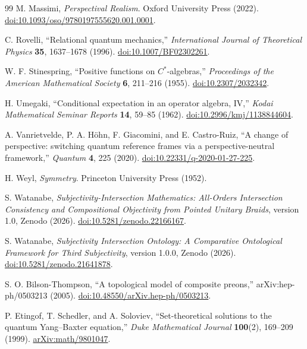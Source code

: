 \documentclass[11pt]{article}
\theoremstyle{definition}
\theoremstyle{remark}
\begin{document}
\begin{thebibliography}{99}
M. Massimi, \emph{Perspectival Realism}. Oxford University Press (2022). \href{https://doi.org/10.1093/oso/9780197555620.001.0001}{doi:10.1093/oso/9780197555620.001.0001}.

C. Rovelli, ``Relational quantum mechanics,'' \emph{International Journal of Theoretical Physics} \textbf{35}, 1637--1678 (1996). \href{https://doi.org/10.1007/BF02302261}{doi:10.1007/BF02302261}.

W. F. Stinespring, ``Positive functions on $C^*$-algebras,'' \emph{Proceedings of the American Mathematical Society} \textbf{6}, 211--216 (1955). \href{https://doi.org/10.2307/2032342}{doi:10.2307/2032342}.

H. Umegaki, ``Conditional expectation in an operator algebra, IV,'' \emph{Kodai Mathematical Seminar Reports} \textbf{14}, 59--85 (1962). \href{https://doi.org/10.2996/kmj/1138844604}{doi:10.2996/kmj/1138844604}.

A. Vanrietvelde, P. A. H\"ohn, F. Giacomini, and E. Castro-Ruiz, ``A change of perspective: switching quantum reference frames via a perspective-neutral framework,'' \emph{Quantum} \textbf{4}, 225 (2020). \href{https://doi.org/10.22331/q-2020-01-27-225}{doi:10.22331/q-2020-01-27-225}.

H. Weyl, \emph{Symmetry}. Princeton University Press (1952).

S. Watanabe, \emph{Subjectivity-Intersection Mathematics: All-Orders Intersection Consistency and Compositional Objectivity from Pointed Unitary Braids}, version 1.0, Zenodo (2026). \href{https://doi.org/10.5281/zenodo.22166167}{doi:10.5281/zenodo.22166167}.

S. Watanabe, \emph{Subjectivity Intersection Ontology: A Comparative Ontological Framework for Third Subjectivity}, version 1.0.0, Zenodo (2026). \href{https://doi.org/10.5281/zenodo.21641878}{doi:10.5281/zenodo.21641878}.

S. O. Bilson-Thompson, ``A topological model of composite preons,'' arXiv:hep-ph/0503213 (2005). \href{https://doi.org/10.48550/arXiv.hep-ph/0503213}{doi:10.48550/arXiv.hep-ph/0503213}.

P. Etingof, T. Schedler, and A. Soloviev, ``Set-theoretical solutions to the quantum Yang--Baxter equation,'' \emph{Duke Mathematical Journal} \textbf{100}(2), 169--209 (1999). \href{https://arxiv.org/abs/math/9801047}{arXiv:math/9801047}.


\end{thebibliography}
\end{document}
